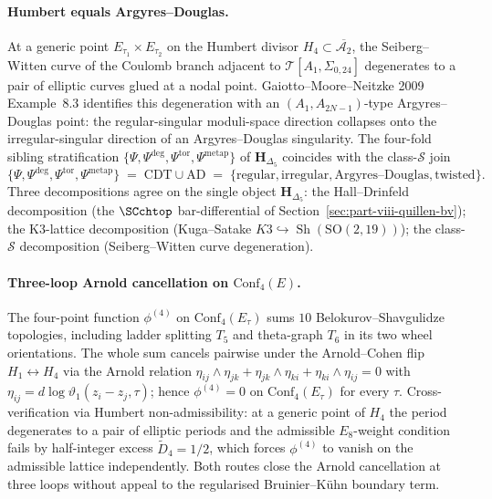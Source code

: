 \paragraph{Humbert equals Argyres--Douglas.}
At a generic point $E_{\tau_1}\times E_{\tau_2}$ on the Humbert
divisor $H_4 \subset \overline{\mathcal{A}_2}$, the Seiberg--Witten
curve of the Coulomb branch adjacent to $\mathcal{T}[A_1,\Sigma_{0,24}]$
degenerates to a pair of elliptic curves glued at a nodal point.
Gaiotto--Moore--Neitzke 2009 Example~8.3 identifies this degeneration
with an $(A_1, A_{2N-1})$-type Argyres--Douglas point: the
regular-singular moduli-space direction collapses onto the
irregular-singular direction of an Argyres--Douglas singularity. The
four-fold sibling stratification
$\{\Psi, \Psi^{\deg}, \Psi^{\mathrm{tor}}, \Psi^{\mathrm{metap}}\}$ of
$\mathbf{H}_{\Delta_5}$ coincides with the class-$\mathcal{S}$ join
\[
\{\Psi,\Psi^{\deg},\Psi^{\mathrm{tor}},\Psi^{\mathrm{metap}}\}
\;=\;
\mathrm{CDT}\cup\mathrm{AD}
\;=\;
\{\text{regular},\text{irregular},\text{Argyres--Douglas},\text{twisted}\}.
\]
Three decompositions agree on the single object
$\mathbf{H}_{\Delta_5}$: the Hall--Drinfeld decomposition (the
$\SCchtop$ bar-differential of
Section~\ref{sec:part-viii-quillen-bv}); the K3-lattice decomposition
(Kuga--Satake $K3 \hookrightarrow \operatorname{Sh}(\mathrm{SO}(2,19))$);
the class-$\mathcal{S}$ decomposition (Seiberg--Witten curve
degeneration).

\paragraph{Three-loop Arnold cancellation on $\mathrm{Conf}_4(E)$.}
The four-point function $\phi^{(4)}$ on $\mathrm{Conf}_4(E_\tau)$
sums $10$ Belokurov--Shavgulidze topologies, including ladder
splitting $T_5$ and theta-graph $T_6$ in its two wheel orientations.
The whole sum cancels pairwise under the Arnold--Cohen flip
$H_1 \leftrightarrow H_4$ via the Arnold relation
$\eta_{ij}\wedge\eta_{jk}+\eta_{jk}\wedge\eta_{ki}+\eta_{ki}\wedge\eta_{ij} = 0$
with $\eta_{ij} = d\log\vartheta_1(z_i - z_j,\tau)$; hence
$\phi^{(4)} = 0$ on $\mathrm{Conf}_4(E_\tau)$ for every $\tau$.
Cross-verification via Humbert non-admissibility: at a generic point
of $H_4$ the period degenerates to a pair of elliptic periods and the
admissible $E_8$-weight condition fails by half-integer excess
$\widetilde{D}_4 = 1/2$, which forces $\phi^{(4)}$ to vanish on the
admissible lattice independently. Both routes close the Arnold
cancellation at three loops without appeal to the regularised
Bruinier--Kühn boundary term.

